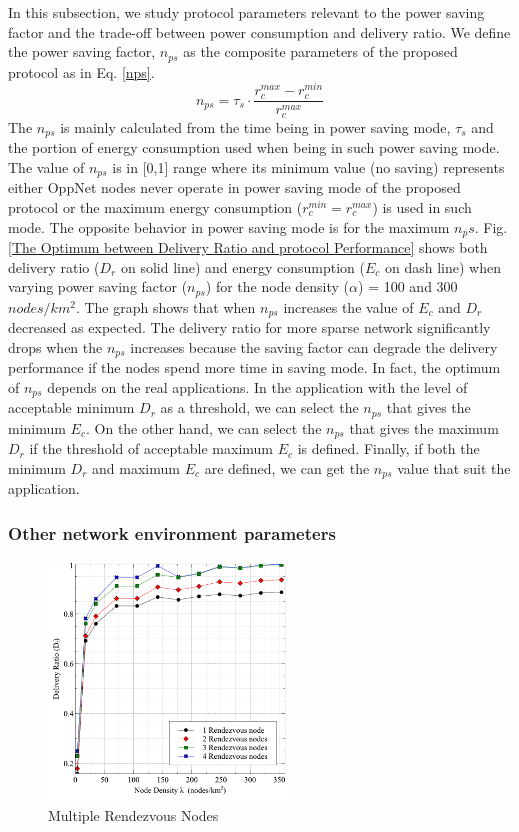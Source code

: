 \documentclass[conference]{IEEEtran}
\begin{document}
In this subsection, we study protocol parameters relevant to the power saving factor and the trade-off between power consumption and delivery ratio.
%
We define the power saving factor, $n_{ps}$ as the composite parameters of the proposed protocol as in Eq. \ref{nps}.
%
\begin{equation}
{ n }_{ ps }={ \tau  }_{ s }\cdot \frac { { r }_{ c }^{ max }-{ r }_{ c }^{ min } }{ { r }_{ c }^{ max } } 
\label{nps}
\end{equation}
The $n_{ps}$ is mainly calculated from the time being in power saving mode, $\tau_s$ and the portion of energy consumption used when being in such power saving mode.
%
The value of $n_{ps}$ is in [0,1] range where its minimum value (no saving) represents either OppNet nodes never operate in power saving mode of the proposed protocol or the maximum energy consumption ($r_c^{min} = r_c^{max}$) is used in such mode.
%
The opposite behavior in power saving mode is for the maximum $n_ps$.
%
Fig. \ref{The Optimum between Delivery Ratio and protocol Performance} shows both delivery ratio ($D_r$ on solid line) and energy consumption ($E_c$ on dash line) when varying power saving factor ($n_{ps}$) for the node density ($\alpha$) = 100 and 300 $nodes/km^2$.
%
The graph shows that when $n_{ps}$ increases the value of $E_c$ and $D_r$ decreased as expected.
%
The delivery ratio for more sparse network significantly drops when the $n_{ps}$ increases because the saving factor can degrade the delivery performance if the nodes spend more time in saving mode.
%
In fact, the optimum of $n_{ps}$ depends on the real applications.
%
In the application with the level of acceptable minimum $D_r$ as a threshold, we can select the $n_{ps}$ that gives the minimum $E_c$.
%
On the other hand, we can select the $n_{ps}$ that gives the maximum $D_r$ if the threshold of acceptable maximum $E_c$ is defined.
%
Finally, if both the minimum $D_r$ and maximum $E_c$ are defined, we can get the $n_{ps}$ value that suit the application.

\subsubsection{Other network environment parameters}

\begin{figure}[!t]
	\centering
	\includegraphics[width=2.5in]{Graphs/MultipleRVs.pdf}
	\caption{Multiple Rendezvous Nodes}
	\label{Multiple Rendezvous Nodes}
\end{figure}
\end{document}
